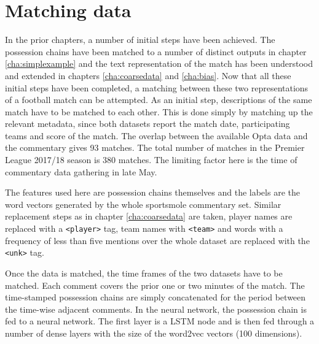 \documentclass[10pt, a4paper]{UUThesisTemplate}
\begin{document}
%


\chapter{Matching data}

In the prior chapters, a number of initial steps have been achieved. The possession chains have been matched to a number of distinct outputs in chapter \ref{cha:simplexample} and the text representation of the match has been understood and extended in chapters \ref{cha:coarsedata} and \ref{cha:bias}. Now that all these initial steps have been completed, a matching between these two representations of a football match can be attempted. As an initial step, descriptions of the same match have to be matched to each other. This is done simply by matching up the relevant metadata, since both datasets report the match date, participating teams and score of the match. The overlap between the available Opta data and the commentary gives 93 matches. The total number of matches in the Premier League 2017/18 season is 380 matches. The limiting factor here is the time of commentary data gathering in late May.

The features used here are possession chains themselves and the labels are the word vectors generated by the whole sportsmole commentary set. Similar replacement steps as in chapter \ref{cha:coarsedata} are taken, player names are replaced with a \texttt{<player>} tag, team names with \texttt{<team>} and words with a frequency of less than five mentions over the whole dataset are replaced with the \texttt{<unk>} tag.

Once the data is matched, the time frames of the two datasets have to be matched. Each comment covers the prior one or two minutes of the match. The time-stamped possession chains are simply concatenated for the period between the time-wise adjacent comments. In the neural network, the possession chain is fed to a neural network. The first layer is a LSTM node and is then fed through a number of dense layers with the size of the word2vec vectors (100 dimensions).
\end{document}
